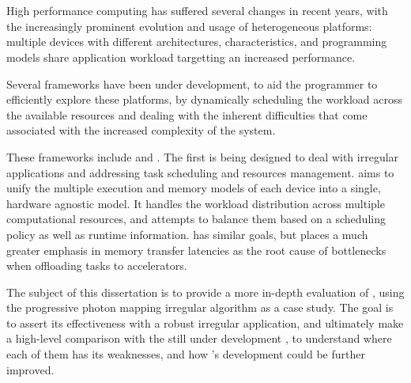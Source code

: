 \documentclass[main.tex]{subfiles}
\begin{document}
\cleardoublepage
{}
{}
\chapter*{\abstractname}

High performance computing has suffered several changes in recent years, with the increasingly prominent evolution and usage of heterogeneous platforms: multiple devices with different architectures, characteristics, and programming models share application workload targetting an increased performance.

Several frameworks have been under development, to aid the programmer to efficiently explore these platforms, by dynamically scheduling the workload across the available resources and dealing with the inherent difficulties that come associated with the increased complexity of the system.

These frameworks include \gama and \starpu. The first is being designed to deal with irregular applications and addressing task scheduling and resources management. \gama aims to unify the multiple execution and memory models of each device into a single, hardware agnostic model. It handles the workload distribution across multiple computational resources, and attempts to balance them based on a scheduling policy as well as runtime information. \starpu has similar goals, but places a much greater emphasis in memory transfer latencies as the root cause of bottlenecks when offloading tasks to accelerators.

The subject of this dissertation is to provide a more in-depth evaluation of \starpu, using the progressive photon mapping irregular algorithm as a case study. The goal is to assert its effectiveness with a robust irregular application, and ultimately make a high-level comparison with the still under development \gama, to understand where each of them has its weaknesses, and how \gama's development could be further improved.
\end{document}
